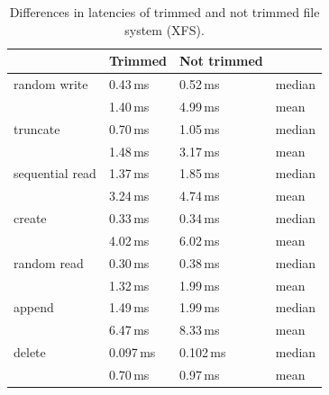 \documentclass[
  color, %
  table, %
  lof,   %
  lot,   %
]{fithesis3}
\begin{document}
\begin{table}
\centering
\begin{tabular}{|l|l|l|l|}
\hline
 &Trimmed & Not trimmed &  \\
\hline
    random write & 0.43\,ms & 0.52\,ms & median \\
 \hline
                 & 1.40\,ms & 4.99\,ms & mean\\
    \hline
        truncate & 0.70\,ms & 1.05\,ms & median\\
    \hline
                 & 1.48\,ms & 3.17\,ms & mean \\
    \hline
           sequential read & 1.37\,ms & 1.85\,ms & median\\
    \hline
                 & 3.24\,ms & 4.74\,ms & mean \\
    \hline
          create & 0.33\,ms & 0.34\,ms & median\\
    \hline
                 & 4.02\,ms & 6.02\,ms & mean \\
    \hline
     random read & 0.30\,ms & 0.38\,ms & median\\
    \hline
                 & 1.32\,ms & 1.99\,ms & mean \\
    \hline
          append & 1.49\,ms & 1.99\,ms & median\\
    \hline
                 & 6.47\,ms & 8.33\,ms & mean \\
    \hline
          delete & 0.097\,ms & 0.102\,ms & median\\
    \hline
                & 0.70\,ms & 0.97\,ms & mean \\
    \hline
\end{tabular}
\caption{Differences in latencies of trimmed and not trimmed file system (XFS).}
\label{tab:trim}
\end{table}





\end{document}

